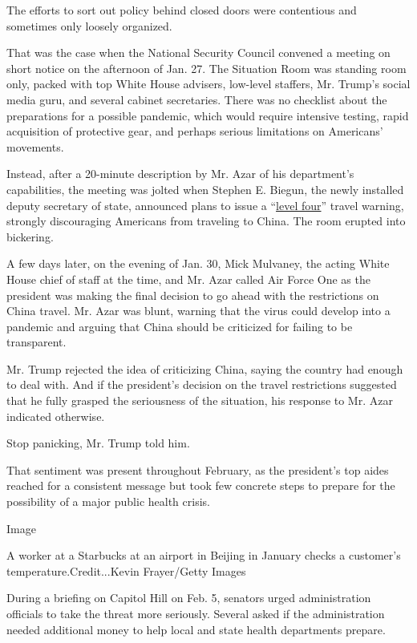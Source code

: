 The efforts to sort out policy behind closed doors were contentious and
sometimes only loosely organized.

That was the case when the National Security Council convened a meeting
on short notice on the afternoon of Jan. 27. The Situation Room was
standing room only, packed with top White House advisers, low-level
staffers, Mr. Trump's social media guru, and several cabinet
secretaries. There was no checklist about the preparations for a
possible pandemic, which would require intensive testing, rapid
acquisition of protective gear, and perhaps serious limitations on
Americans' movements.

Instead, after a 20-minute description by Mr. Azar of his department's
capabilities, the meeting was jolted when Stephen E. Biegun, the newly
installed deputy secretary of state, announced plans to issue a
``\href{https://travel.state.gov/content/travel/en/traveladvisories/ea/travel-advisory-alert-global-level-4-health-advisory-issue.html}{level
four}'' travel warning, strongly discouraging Americans from traveling
to China. The room erupted into bickering.

A few days later, on the evening of Jan. 30, Mick Mulvaney, the acting
White House chief of staff at the time, and Mr. Azar called Air Force
One as the president was making the final decision to go ahead with the
restrictions on China travel. Mr. Azar was blunt, warning that the virus
could develop into a pandemic and arguing that China should be
criticized for failing to be transparent.

Mr. Trump rejected the idea of criticizing China, saying the country had
enough to deal with. And if the president's decision on the travel
restrictions suggested that he fully grasped the seriousness of the
situation, his response to Mr. Azar indicated otherwise.

Stop panicking, Mr. Trump told him.

That sentiment was present throughout February, as the president's top
aides reached for a consistent message but took few concrete steps to
prepare for the possibility of a major public health crisis.

Image

A worker at a Starbucks at an airport in Beijing in January checks a
customer's temperature.Credit...Kevin Frayer/Getty Images

During a briefing on Capitol Hill on Feb. 5, senators urged
administration officials to take the threat more seriously. Several
asked if the administration needed additional money to help local and
state health departments prepare.

